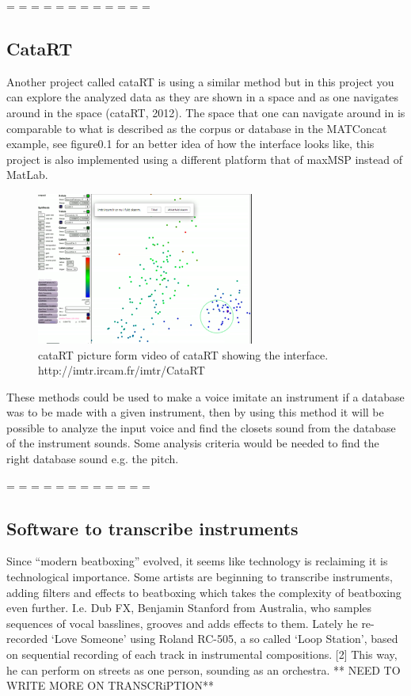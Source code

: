  			
 				  = = = = = = = = = = = = 
\subsection{ CataRT }
Another project called cataRT is using a similar method but in this project you can explore the analyzed data as they are shown in a space and as one navigates around in the space (cataRT, 2012). The space that one can navigate around in is comparable to what is described as the corpus or database in the MATConcat example, see figure0.1 for an better idea of how the interface looks like, this project is also implemented using a different platform that of maxMSP instead of MatLab.\\
\begin{figure}[h]
	\begin{center}
		\includegraphics[height=5cm]{fig/cataRT.png}
		\caption{cataRT picture form video of cataRT showing the interface. http://imtr.ircam.fr/imtr/CataRT}
		\label{cataRT}
	\end{center}
\end{figure} 
These methods could be used to make a voice imitate an instrument if a database was to be made with a given instrument, then by using this method it will be possible to analyze the input voice and find the closets sound from the database of the instrument sounds. Some analysis criteria would be needed to find the right database sound e.g. the pitch. 

 				  = = = = = = = = = = = =

\subsection{ Software to transcribe instruments }
Since “modern beatboxing” evolved, it seems like technology is reclaiming it is technological importance. Some artists are beginning to transcribe instruments, adding filters and effects to beatboxing which takes the complexity of beatboxing even further. I.e. Dub FX, Benjamin Stanford from Australia, who samples sequences of vocal basslines, grooves and adds effects to them. Lately he re-recorded ‘Love Someone’ using Roland RC-505, a so called ‘Loop Station’, based on sequential recording of each track in instrumental compositions. [2] This way, he can perform on streets as one person, sounding as an orchestra. ** NEED TO WRITE MORE ON TRANSCRiPTION**